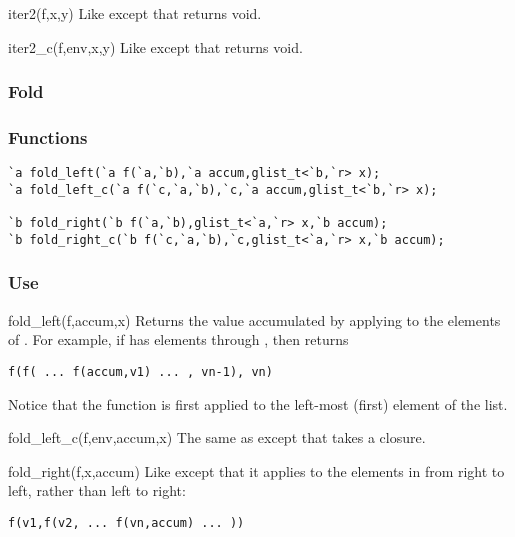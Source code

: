 \begin{defun}{iter2}{(f,x,y)}
Like  except that  returns
void.
\end{defun}

\begin{defun}{iter2_c}{(f,env,x,y)}
Like  except that 
returns void.
\end{defun}


\subsubsection*{Fold}
\subsubsection*{Functions}
\begin{verbatim}
`a fold_left(`a f(`a,`b),`a accum,glist_t<`b,`r> x);
`a fold_left_c(`a f(`c,`a,`b),`c,`a accum,glist_t<`b,`r> x);

`b fold_right(`b f(`a,`b),glist_t<`a,`r> x,`b accum);
`b fold_right_c(`b f(`c,`a,`b),`c,glist_t<`a,`r> x,`b accum);
\end{verbatim}

\subsubsection*{Use}

\begin{defun}{fold_left}{(f,accum,x)}
Returns the value accumulated by applying  to the elements of
.  For example, if  has elements  through
, then  returns

\begin{verbatim}
f(f( ... f(accum,v1) ... , vn-1), vn)
\end{verbatim}

\noindent Notice that the function is first applied to the left-most (first)
element of the list.
\end{defun}

\begin{defun}{fold_left_c}{(f,env,accum,x)}
The same as  except that  takes a closure.
\end{defun}

\begin{defun}{fold_right}{(f,x,accum)}
Like  except that it applies  to the elements
in  from right to left, rather than left to right:

\begin{verbatim}
f(v1,f(v2, ... f(vn,accum) ... ))
\end{verbatim}
\end{defun}

